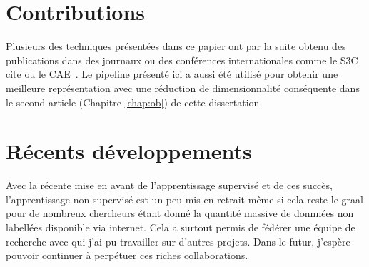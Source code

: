 \section{Contributions}

Plusieurs des techniques pr\'{e}sent\'{e}es dans ce papier ont par la suite
obtenu des publications dans des journaux ou des conf\'{e}rences
internationales comme le S3C~\citep{Courville+al-2011} cite ou le
CAE~\citep{Rifai+al-2011}. Le pipeline pr\'{e}sent\'{e} ici a aussi \'{e}t\'{e}
utilis\'{e} pour obtenir une meilleure repr\'{e}sentation avec une
r\'{e}duction de dimensionnalit\'{e} cons\'{e}quente dans le second article
(Chapitre \ref{chap:ob}) de cette dissertation. 

\section{R\'{e}cents d\'{e}veloppements}

Avec la r\'{e}cente mise en avant de l'apprentissage supervis\'{e} et de ces
succ\`{e}s, l'apprentissage non supervis\'{e} est un peu mis en retrait
m\^{e}me si cela reste le graal pour de nombreux chercheurs \'{e}tant donn\'{e}
la quantit\'{e} massive de donnn\'{e}es non labell\'{e}es disponible via
internet. Cela a surtout permis de f\'{e}d\'{e}rer une \'{e}quipe de recherche
avec qui j'ai pu travailler sur d'autres projets. Dans le futur, j'esp\`{e}re
pouvoir continuer \`{a} perp\'{e}tuer ces riches collaborations.
